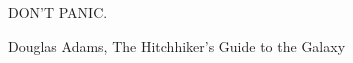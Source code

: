 \documentclass[tcc]{subfile}
\begin{document}
\begin{epigrafe}
    \vspace*{\fill}
	\begin{flushright}
        \epigraph{\huge DON'T PANIC.}{Douglas Adams, The Hitchhiker's Guide to the Galaxy}
	\end{flushright}
\end{epigrafe}
\end{document}
